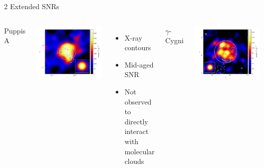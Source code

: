 \documentclass[12pt]{beamer}
\begin{document}
\begin{frame}{2 Extended SNRs}
  \begin{columns}
    Puppis A

    \includegraphics[scale=0.40]{plots/source_Puppis_A_color.pdf}

    \begin{itemize}
      \item X-ray contours
      \item Mid-aged SNR
      \item Not observed to directly interact with molecular
        clouds
      \end{itemize}

    $\gamma$-Cygni

    \includegraphics[scale=0.40]{plots/source_Gamma_Cygni_color.pdf}


\end{columns}
\end{frame}
\end{document}
